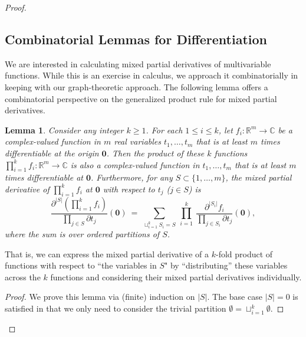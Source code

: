 \documentclass[12pt, reqno, oneside]{amsart}
\newtheorem{lemma}[corollary]{Lemma}
\numberwithin{equation}{section}
\begin{document}
\begin{proof}
%
%

\subsection{Combinatorial Lemmas for Differentiation}\label{subsec:derivation}
We are interested in calculating mixed partial derivatives of multivariable functions. While this is an exercise in calculus, we approach it combinatorially in keeping with our graph-theoretic approach. The following lemma offers a combinatorial perspective on the generalized product rule for mixed partial derivatives.

\begin{lemma}\label{lemma:prod-rule}
Consider any integer $k \geq 1$. For each $1 \leq i \leq k$, let $f_i:\mathbb{R}^m\to\mathbb{C}$ be a complex-valued function in $m$ real variables $t_1,\dots,t_m$ that is at least $m$ times differentiable at the origin $\mathbf{0}$. Then the product of these $k$ functions $\prod_{i=1}^k f_i:\mathbb{R}^m\to\mathbb{C}$ is also a complex-valued function in $t_1,\dots,t_m$ that is at least $m$ times differentiable at $\mathbf{0}$. Furthermore, for any $S \subset \{1, \dots, m\}$, the mixed partial derivative of $\prod_{i=1}^k f_i$ at $\mathbf{0}$ with respect to $t_j$ ($j\in S$) is 
\begin{equation}\label{eq:prod-rule}
\frac{\partial^{|S|}\left(\prod_{i=1}^k f_i\right)}{\prod_{j \in S}\partial t_j}(\mathbf{0}) \ = \ \sum_{\sqcup_{i=1}^k S_i = S} \ \prod_{i=1}^k \  \frac{\partial^{|S_i|} f_i}{\prod_{j \in S_i }\partial t_j}(\mathbf{0}),
\end{equation}
where the sum is over ordered partitions of $S$.
\end{lemma}

That is, we can express the mixed partial derivative of a $k$-fold product of functions with respect to ``the variables in $S$" by ``distributing'' these variables across the $k$ functions and considering their mixed partial derivatives individually. 

\begin{proof}
We prove this lemma via (finite) induction on $|S|$. The base case $|S|=0$ is satisfied in that we only need to consider the trivial partition $\emptyset=\sqcup_{i=1}^k \emptyset$.  


\end{proof}
\end{proof}
\end{document}
